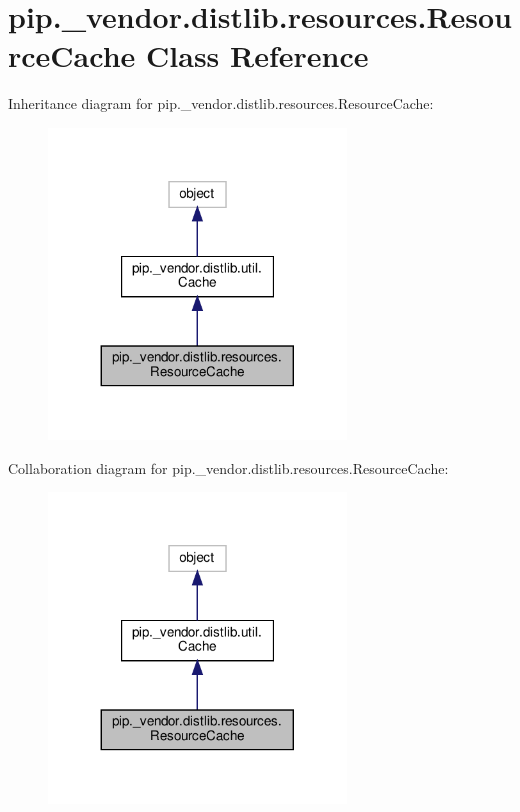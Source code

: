 \hypertarget{classpip_1_1__vendor_1_1distlib_1_1resources_1_1ResourceCache}{}\section{pip.\+\_\+vendor.\+distlib.\+resources.\+Resource\+Cache Class Reference}
\label{classpip_1_1__vendor_1_1distlib_1_1resources_1_1ResourceCache}


Inheritance diagram for pip.\+\_\+vendor.\+distlib.\+resources.\+Resource\+Cache\+:
\nopagebreak
\begin{figure}[H]
\begin{center}
\leavevmode
\includegraphics[width=224pt]{classpip_1_1__vendor_1_1distlib_1_1resources_1_1ResourceCache__inherit__graph}
\end{center}
\end{figure}


Collaboration diagram for pip.\+\_\+vendor.\+distlib.\+resources.\+Resource\+Cache\+:
\nopagebreak
\begin{figure}[H]
\begin{center}
\leavevmode
\includegraphics[width=224pt]{classpip_1_1__vendor_1_1distlib_1_1resources_1_1ResourceCache__coll__graph}
\end{center}
\end{figure}
